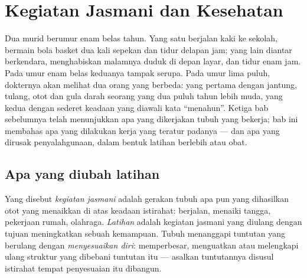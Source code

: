 \chapter{Kegiatan Jasmani dan Kesehatan}\label{ch:g10:sport-and-health}

Dua murid berumur enam belas tahun. Yang satu berjalan kaki ke sekolah,
bermain bola basket dua kali sepekan dan tidur delapan jam; yang lain
diantar berkendara, menghabiskan malamnya duduk di depan layar, dan
tidur enam jam. Pada umur enam belas keduanya tampak serupa. Pada umur
lima puluh, dokternya akan melihat dua orang yang berbeda: yang pertama
dengan jantung, tulang, otot dan gula darah seorang yang dua puluh
tahun lebih muda, yang kedua dengan sederet keadaan yang diawali kata
``menahun''. Ketiga bab sebelumnya telah menunjukkan apa yang dikerjakan
tubuh yang bekerja; bab ini membahas apa yang dilakukan kerja yang
teratur padanya --- dan apa yang dirusak penyalahgunaan, dalam bentuk
latihan berlebih atau obat.

\section{Apa yang diubah latihan}

\begin{definition}\label{def:g10:sport-and-health:training}
Yang disebut \emph{kegiatan jasmani} adalah
gerakan tubuh apa pun yang dihasilkan otot yang menaikkan  di atas keadaan istirahat: berjalan, menaiki tangga, pekerjaan
rumah, olahraga. \emph{Latihan} adalah kegiatan jasmani yang diulang
dengan tujuan meningkatkan sebuah kemampuan. Tubuh menanggapi tuntutan
yang berulang dengan \emph{menyesuaikan diri}: memperbesar, menguatkan
atau melengkapi ulang struktur yang dibebani tuntutan itu --- asalkan
tuntutannya disusul istirahat tempat penyesuaian itu dibangun.
\end{definition}

